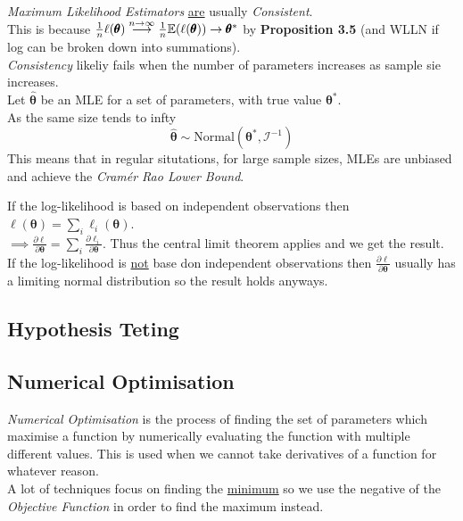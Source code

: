 \documentclass[11pt,a4paper]{article}
\begin{document}
\textit{Maximum Likelihood Estimators} \underline{are} usually \textit{Consistent}.\\
This is because $\frac1n\ell(\pmb\theta)\overset{n\to\infty}{\longrightarrow}\frac{1}{n}\mathbb{E}(\ell(\pmb\theta))\to\pmb\theta^*$ by \textbf{Proposition 3.5} (and WLLN if log can be broken down into summations).\\
\nb \textit{Consistency} likeliy fails when the number of parameters increases as sample sie increases.\\

Let $\hat{\pmb\theta}$ be an MLE for a set of parameters, with true value $\pmb\theta^*$.\\
As the same size tends to infty
$$\hat{\pmb\theta}\sim\text{Normal}(\pmb\theta^*,\mathcal{I}^{-1})$$
This means that in regular situtations, for large sample sizes, MLEs are unbiased and achieve the \textit{Cram\'er Rao Lower Bound}.

If the log-likelihood is based on independent observations then $\ell(\pmb\theta)=\sum_i\ell_i(\pmb\theta)$.\\
$\implies\frac{\partial\ell}{\partial\pmb\theta}=\sum_i\frac{\partial\ell_i}{\partial\pmb\theta}$.
Thus the central limit theorem applies and we get the result.\\
If the log-likelihood is \underline{not} base don independent observations then $\frac{\partial\ell}{\partial\pmb\theta}$ usually has a limiting normal distribution so the result holds anyways.\proved

\subsection{Hypothesis Teting}



\subsection{Numerical Optimisation}

\textit{Numerical Optimisation} is the process of finding the set of parameters which maximise a function by numerically evaluating the function with multiple different values. This is used when we cannot take derivatives of a function for whatever reason.\\
\nb A lot of techniques focus on finding the \underline{minimum} so we use the negative of the \textit{Objective Function} in order to find the maximum instead.\\
\end{document}

